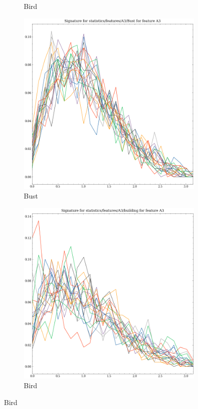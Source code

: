 \begin{figure}[ht]
\begin{subfigure}[b]{0.23\textwidth}
        \caption{Bird}
        \label{fig:features-statistics-A3-f}    
    \end{subfigure}
    \hfill
    \begin{subfigure}[b]{0.23\textwidth}
        \includegraphics[width=\textwidth]{assets/feature_extraction/A3/Bust.png}
        \caption{Bust}
        \label{fig:features-statistics-A3-g}    
    \end{subfigure}
    \hfill
    \begin{subfigure}[b]{0.23\textwidth}
        \includegraphics[width=\textwidth]{assets/feature_extraction/A3/building.png}
        \caption{Bird}
        \label{fig:features-statistics-A3-h}    
    \end{subfigure}
    \hfill


\end{figure}
